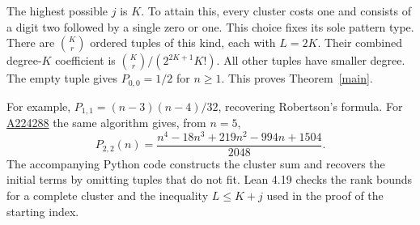 \documentclass[11pt,letterpaper]{article}
\begin{document}
The highest possible $j$ is $K$. To attain this, every cluster costs one and consists of a digit two followed by a single zero or one. This choice fixes its sole pattern type. There are $\binom Kr$ ordered tuples of this kind, each with $L=2K$. Their combined degree-$K$ coefficient is $\binom Kr/(2^{2K+1}K!)$. All other tuples have smaller degree. The empty tuple gives $P_{0,0}=1/2$ for $n\ge1$. This proves Theorem~\ref{main}.

For example, $P_{1,1}=(n-3)(n-4)/32$, recovering Robertson's formula. For \href{https://oeis.org/A224288}{A224288} the same algorithm gives, from $n=5$,
\[
 P_{2,2}(n)=\frac{n^4-18n^3+219n^2-994n+1504}{2048}.
\]
The accompanying Python code constructs the cluster sum and recovers the initial terms by omitting tuples that do not fit. Lean 4.19 checks the rank bounds for a complete cluster and the inequality $L\le K+j$ used in the proof of the starting index.
\end{document}
